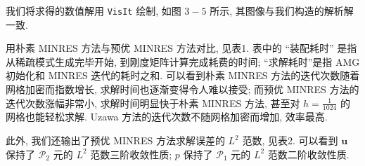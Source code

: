 \documentclass[lang=cn,11pt,a4paper]{elegantpaper}
\begin{document}
我们将求得的数值解用 \verb|VisIt| 绘制, 如图 $3-5$ 所示, 
其图像与我们构造的解析解一致. 

用朴素 MINRES 方法与预优 MINRES 方法对比, 见表1. 
表中的 “装配耗时” 是指从稀疏模式生成完毕开始, 到刚度矩阵计算完成耗费的时间; 
“求解耗时”是指 AMG 初始化和 MINRES 迭代的耗时之和. 
可以看到朴素 MINRES 方法的迭代次数随着网格加密而指数增长, 
求解时间也逐渐变得令人难以接受; 
而预优 MINRES 方法的迭代次数涨幅非常小, 
求解时间明显快于朴素 MINRES 方法, 
甚至对 $h=\frac{1}{1024}$ 的网格也能轻松求解. 
Uzawa 方法的迭代次数不随网格加密而增加, 效率最高.

此外, 我们还输出了预优 MINRES 方法求解误差的 $L^2$ 范数, 
见表2. 可以看到 $\mathbf{u}$ 保持了 $\mathcal{P}_2$ 元的
$L^2$ 范数三阶收敛性质; $p$ 保持了 $\mathcal{P}_1$ 元的
$L^2$ 范数二阶收敛性质. 

\end{document}
